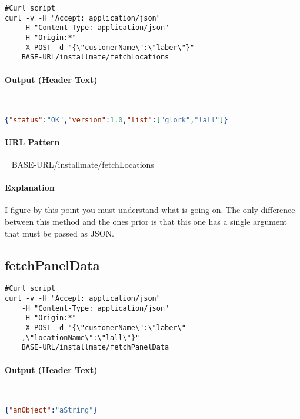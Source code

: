\documentclass[
10pt, %
letterpaper, %
oneside, %
headinclude,footinclude, %
BCOR5mm, %
]{scrartcl}
\begin{document}
\begin{lstlisting}
#Curl script
curl -v -H "Accept: application/json" 
	-H "Content-Type: application/json" 
	-H "Origin:*"
	-X POST -d "{\"customerName\":\"laber\"}" 
	BASE-URL/installmate/fetchLocations
\end{lstlisting}

\paragraph{Output (Header Text)}~
\begin{lstlisting}[language=json]
{"status":"OK","version":1.0,"list":["glork","lall"]}
\end{lstlisting}

\paragraph{URL Pattern} 
~\newline
BASE-URL/installmate/fetchLocations

\paragraph{Explanation} I figure by this point you must understand what is going on. The only difference between this method and the ones prior is that this one has a single argument that must be passed as JSON.



\subsection{\textbf{fetchPanelData}}

\begin{lstlisting}
#Curl script
curl -v -H "Accept: application/json" 
	-H "Content-Type: application/json" 
	-H "Origin:*"
	-X POST -d "{\"customerName\":\"laber\"
	,\"locationName\":\"lall\"}"
	BASE-URL/installmate/fetchPanelData
\end{lstlisting}

\paragraph{Output (Header Text)}~
\begin{lstlisting}[language=json]
{"anObject":"aString"}
\end{lstlisting}
\end{document}
